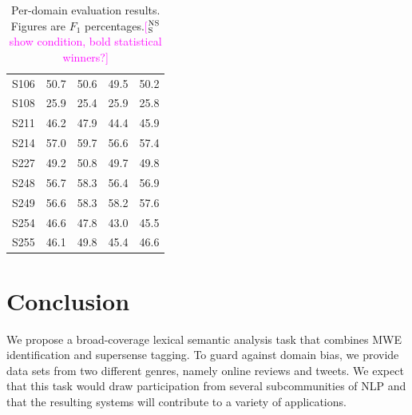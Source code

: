 \documentclass[11pt,letterpaper]{article}
\newcommand{\ensuretext}[1]{#1}
\newcommand{\nssmarker}{\ensuretext{\textcolor{magenta}{\ensuremath{^{\textsc{NS}}_{\textsc{S}}}}}}
\newcommand{\arkcomment}[3]{\ensuretext{\textcolor{#3}{[#1 #2]}}}
\newcommand{\nss}[1]{\arkcomment{\nssmarker}{#1}{magenta}}
\begin{document}
\begin{table}
\begin{tabular}{lrrrr}
S106        &    50.7 & 50.6 &    49.5 &       50.2 \\
S108        &    25.9 & 25.4 &    25.9 &       25.8 \\
S211        &    46.2 & 47.9 &    44.4 &       45.9 \\
S214        &    57.0 & 59.7 &    56.6 &       57.4 \\
S227        &    49.2 & 50.8 &    49.7 &       49.8 \\
S248        &    56.7 & 58.3 &    56.4 &       56.9 \\
S249        &    56.6 & 58.3 &    58.2 &       57.6 \\
S254        &    46.6 & 47.8 &    43.0 &       45.5 \\
S255        &    46.1 & 49.8 &    45.4 &       46.6 \\

\bottomrule
\end{tabular}

\caption{Per-domain evaluation results. Figures are $F_1$ percentages.\nss{show condition, bold statistical winners?}}	
\label{tbl:per-domain-results}
\end{table}





\section{Conclusion}
We propose a broad-coverage lexical semantic analysis task that combines MWE identification and supersense tagging. 
To guard against domain bias, we provide data sets from two different genres, namely online reviews and tweets. 
We expect that this task would draw participation from several subcommunities of NLP 
and that the resulting systems will contribute to a variety of applications.
\end{document}
